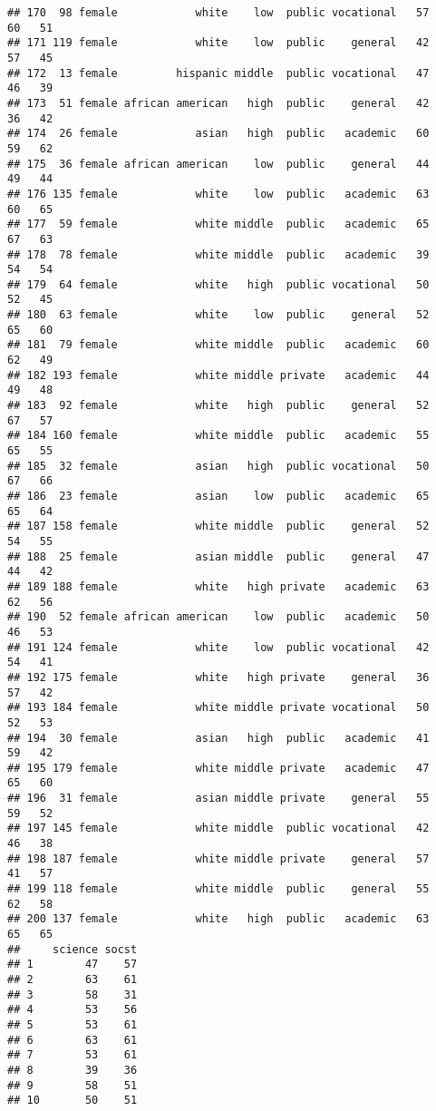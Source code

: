 \documentclass[
]{article}
\begin{document}
\begin{verbatim}
## 170  98 female            white    low  public vocational   57    60   51
## 171 119 female            white    low  public    general   42    57   45
## 172  13 female         hispanic middle  public vocational   47    46   39
## 173  51 female african american   high  public    general   42    36   42
## 174  26 female            asian   high  public   academic   60    59   62
## 175  36 female african american    low  public    general   44    49   44
## 176 135 female            white    low  public   academic   63    60   65
## 177  59 female            white middle  public   academic   65    67   63
## 178  78 female            white middle  public   academic   39    54   54
## 179  64 female            white   high  public vocational   50    52   45
## 180  63 female            white    low  public    general   52    65   60
## 181  79 female            white middle  public   academic   60    62   49
## 182 193 female            white middle private   academic   44    49   48
## 183  92 female            white   high  public    general   52    67   57
## 184 160 female            white middle  public   academic   55    65   55
## 185  32 female            asian   high  public vocational   50    67   66
## 186  23 female            asian    low  public   academic   65    65   64
## 187 158 female            white middle  public    general   52    54   55
## 188  25 female            asian middle  public    general   47    44   42
## 189 188 female            white   high private   academic   63    62   56
## 190  52 female african american    low  public   academic   50    46   53
## 191 124 female            white    low  public vocational   42    54   41
## 192 175 female            white   high private    general   36    57   42
## 193 184 female            white middle private vocational   50    52   53
## 194  30 female            asian   high  public   academic   41    59   42
## 195 179 female            white middle private   academic   47    65   60
## 196  31 female            asian middle private    general   55    59   52
## 197 145 female            white middle  public vocational   42    46   38
## 198 187 female            white middle private    general   57    41   57
## 199 118 female            white middle  public    general   55    62   58
## 200 137 female            white   high  public   academic   63    65   65
##     science socst
## 1        47    57
## 2        63    61
## 3        58    31
## 4        53    56
## 5        53    61
## 6        63    61
## 7        53    61
## 8        39    36
## 9        58    51
## 10       50    51

\end{verbatim}
\end{document}
